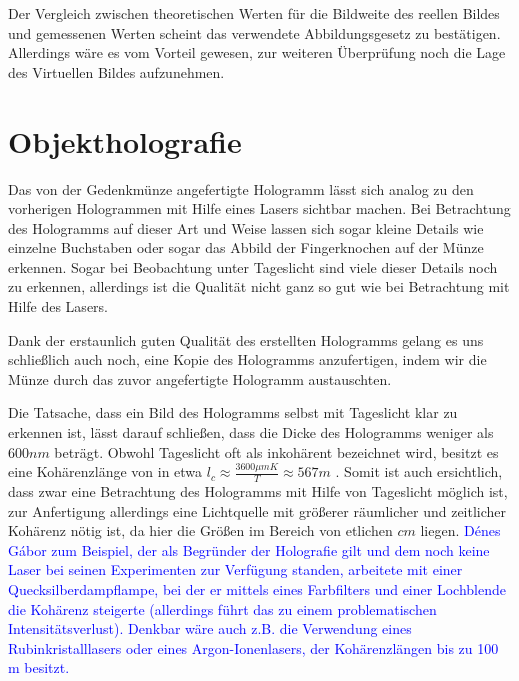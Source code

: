 \documentclass[bigchapter,colorback,accentcolor=tud4b,linedtoc,11pt]{tudreport}
\begin{document}
Der Vergleich zwischen theoretischen Werten für die Bildweite des reellen Bildes
und gemessenen Werten scheint das verwendete Abbildungsgesetz zu
bestätigen. Allerdings wäre es vom Vorteil gewesen, zur weiteren Überprüfung
noch die Lage des Virtuellen Bildes aufzunehmen.

\section{Objektholografie}

Das von der Gedenkmünze angefertigte Hologramm lässt sich analog zu den
vorherigen Hologrammen mit Hilfe eines Lasers sichtbar machen. Bei Betrachtung
des Hologramms auf dieser Art und Weise lassen sich sogar kleine Details wie
einzelne Buchstaben oder sogar das Abbild der Fingerknochen auf der Münze
erkennen. Sogar bei Beobachtung unter Tageslicht sind viele dieser Details noch
zu erkennen, allerdings ist die Qualität nicht ganz so gut wie bei Betrachtung
mit Hilfe des Lasers.

Dank der erstaunlich guten Qualität des erstellten Hologramms gelang es uns
schließlich auch noch, eine Kopie des Hologramms anzufertigen, indem wir die
Münze durch das zuvor angefertigte Hologramm austauschten.

Die Tatsache, dass ein Bild des Hologramms selbst mit Tageslicht klar zu
erkennen ist, lässt darauf schließen, dass die Dicke des Hologramms weniger als
$600 nm$ beträgt. Obwohl Tageslicht oft als inkohärent bezeichnet wird,
besitzt es eine Kohärenzlänge von in etwa
$l_c \approx \frac{3600\mu m K}{T} \approx 567 m$ \cite{blackbodycoherence}. Somit ist auch
ersichtlich, dass zwar eine Betrachtung des Hologramms mit Hilfe von Tageslicht
möglich ist, zur Anfertigung allerdings eine Lichtquelle mit größerer räumlicher
und zeitlicher Kohärenz nötig ist, da hier die Größen im Bereich von etlichen
$cm$ liegen. \textcolor{blue}{Dénes Gábor zum Beispiel, der als Begründer der Holografie gilt und dem noch keine Laser bei seinen Experimenten zur Verfügung standen, arbeitete mit einer Quecksilberdampflampe, bei der er mittels eines Farbfilters und einer Lochblende die Kohärenz steigerte (allerdings führt das zu einem problematischen Intensitätsverlust). Denkbar wäre auch z.B. die Verwendung eines Rubinkristalllasers oder eines Argon-Ionenlasers, der Kohärenzlängen bis zu 100 m besitzt.}
\end{document}
